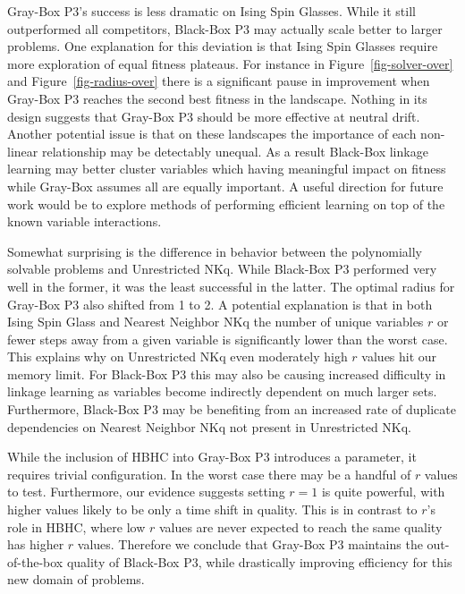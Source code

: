 Gray-Box P3's success is less dramatic on Ising Spin Glasses.
While it still outperformed all competitors, Black-Box P3 may actually scale better to larger
problems. One explanation for this deviation is that Ising Spin Glasses require more
exploration of equal fitness plateaus. For instance in Figure~\ref{fig-solver-over} and Figure~\ref{fig-radius-over}
there is a significant pause in improvement when Gray-Box P3 reaches the second best fitness in the landscape.
Nothing in its design suggests that Gray-Box P3 should be more effective at neutral drift. Another potential
issue is that on these landscapes the importance of each non-linear relationship may be detectably unequal.
As a result Black-Box linkage learning may better cluster variables which having meaningful
impact on fitness while Gray-Box assumes all are equally important. A useful direction for future work
would be to explore methods of performing efficient learning on top of the known variable interactions.

Somewhat surprising is the difference in behavior between the polynomially solvable problems
and Unrestricted NKq. While Black-Box P3 performed very well in the former, it was the least
successful in the latter. The optimal radius for Gray-Box P3 also shifted from 1 to 2.
A potential explanation is that in both Ising Spin Glass
and Nearest Neighbor NKq the number of unique variables $r$
or fewer steps away from a given variable is significantly lower than the worst case. This explains why on Unrestricted NKq
even moderately high $r$ values hit our memory limit.
For Black-Box P3 this may also be causing increased difficulty in linkage learning as variables
become indirectly dependent on much larger sets. Furthermore, Black-Box
P3 may be benefiting from an increased rate of duplicate dependencies on Nearest Neighbor NKq
not present in Unrestricted NKq.

While the inclusion of HBHC into Gray-Box P3 introduces a parameter, it requires
trivial configuration. In the worst case there may be a handful of $r$ values to test.
Furthermore, our evidence suggests setting $r=1$ is quite powerful, with higher values
likely to be only a time shift in quality. This is in contrast to $r$'s role in HBHC,
where low $r$ values are never expected to reach the same quality has higher $r$ values.
Therefore we conclude that Gray-Box P3 maintains the out-of-the-box quality of Black-Box
P3, while drastically improving efficiency for this new domain of problems.

